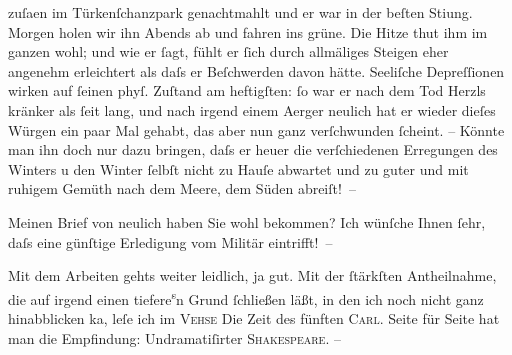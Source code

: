                   zuſa{\geminationm}en im Türkenſchanzpark genachtmahlt und er war in der beſten Sti{\geminationm}ung. Morgen holen wir ihn Abends ab und fahren ins
               grüne. Die Hitze thut ihm im ganzen wohl; und wie er{ }ſagt, fühlt er{ }ſich durch
               allmäliges Steigen eher angenehm erleichtert als daſs er Beſchwerden davon hätte. {\pb}Seeliſche Depreſſionen wirken auf{ }ſeinen phyſ. Zuſtand
               am heftigſten:{ }ſo war er nach dem Tod Herzls
               kränker als{ }ſeit lang, und nach irgend einem Aerger neulich hat er wieder dieſes
               Würgen ein paar Mal gehabt, das aber nun ganz verſchwunden{ }ſcheint. – Könnte man ihn
               doch nur dazu bringen, daſs er heuer die verſchiedenen Erregungen des Winters \introOben{}u den Winter{ }ſelbſt\introOben{} nicht zu Hauſe abwartet und zu guter
                  \label{T_L01424-2v}\label{T_L01424-2} und mit ruhigem Gemüth
                  {\pb}nach dem Meere, dem Süden abreiſt! –\pend
           
\pstart
           Meinen Brief von neulich haben Sie wohl bekommen? Ich wünſche Ihnen{ }ſehr, daſs eine
               günſtige Erledigung vom Militär eintrifft! –\pend
           
\pstart
           Mit dem Arbeiten gehts weiter leidlich, ja gut. Mit der{ }ſtärkſten Antheilnahme, die
               auf irgend ein\introOben{}en\introOben{} tiefere\substVorne{}\textsuperscript{s}\substDazwischen{}n\substHinten{} Grund{ }ſchließen läßt, in den ich noch nicht ganz hinabblicken ka{\geminationn}, leſe ich im \textsc{Vehse}{ }{\pb}Die Zeit des fünften
                        \textsc{Carl}. Seite für Seite hat man die Empfindung: Undramatiſirter \textsc{Shakespeare}. –\pend
           
